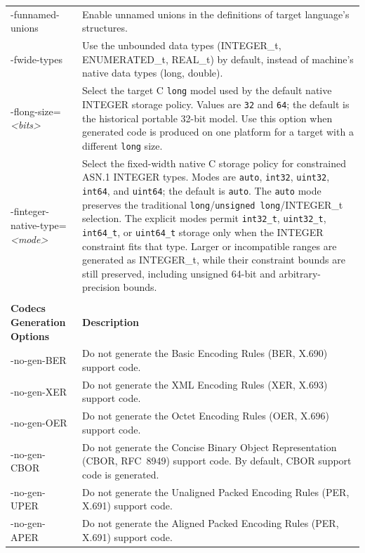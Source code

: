 \documentclass[english,oneside,12pt]{book}
\begin{document}
\begin{longtable}{lp{4in}}
{\ttfamily -funnamed-unions} & {\small Enable  unnamed  unions in the definitions of target language's structures.}\\
{\ttfamily -fwide-types} & {\small Use the unbounded data types (INTEGER\_t, ENUMERATED\_t, REAL\_t) by default, instead of machine's native data types (long, double).}\\
{\ttfamily -flong-size=\emph{<bits>}} & {\small Select the target C \texttt{long} model used by the default native INTEGER storage policy. Values are \texttt{32} and \texttt{64}; the default is the historical portable 32-bit model. Use this option when generated code is produced on one platform for a target with a different \texttt{long} size.}\\
{\ttfamily -finteger-native-type=\emph{<mode>}} & {\small Select the fixed-width native C storage policy for constrained ASN.1 INTEGER types. Modes are \texttt{auto}, \texttt{int32}, \texttt{uint32}, \texttt{int64}, and \texttt{uint64}; the default is \texttt{auto}. The \texttt{auto} mode preserves the traditional \texttt{long}/\texttt{unsigned long}/INTEGER\_t selection. The explicit modes permit \texttt{int32\_t}, \texttt{uint32\_t}, \texttt{int64\_t}, or \texttt{uint64\_t} storage only when the INTEGER constraint fits that type. Larger or incompatible ranges are generated as INTEGER\_t, while their constraint bounds are still preserved, including unsigned 64-bit and arbitrary-precision bounds.}\\\\
\textbf{Codecs Generation Options} & \textbf{Description}\\
\midrule
{\ttfamily -no-gen-BER} & {\small Do not generate the Basic Encoding Rules (BER, X.690) support code.}\\
{\ttfamily -no-gen-XER} & {\small Do not generate the XML Encoding Rules (XER, X.693) support code.}\\
{\ttfamily -no-gen-OER} & {\small Do not generate the Octet Encoding Rules (OER, X.696) support code.}\\
{\ttfamily -no-gen-CBOR} & {\small Do not generate the Concise Binary Object Representation (CBOR, RFC~8949) support code. By default, CBOR support code is generated.}\\
{\ttfamily -no-gen-UPER} & {\small Do not generate the Unaligned Packed Encoding Rules (PER, X.691) support code.}\\
{\ttfamily -no-gen-APER} & {\small Do not generate the Aligned Packed Encoding Rules (PER, X.691) support code.}\\

\end{longtable}
\end{document}
